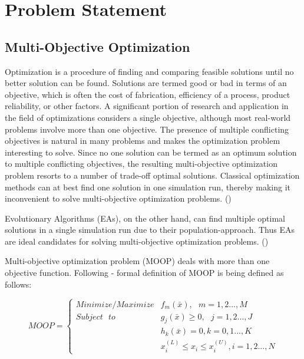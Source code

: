\chapter{Problem Statement}
\label{cha:multiObjectiveOptimization}




\section{Multi-Objective Optimization}
\label{sec:multi}

Optimization is a procedure of finding and comparing feasible solutions until no better solution can be found.
Solutions are termed good or bad in terms of an objective, which is often the cost of fabrication, efficiency of a process, product reliability,
or other factors.
A significant portion of research and application in the field of optimizations considers a single objective, although most real-world problems involve more than one objective.
The presence of multiple conflicting objectives is natural in many problems and makes the optimization problem interesting to solve.
Since no one solution can be termed as an optimum solution to multiple conflicting objectives, the resulting multi-objective optimization problem resorts to a number
of trade-off optimal solutions.
Classical optimization methods can at best find one solution in one simulation run, thereby making it inconvenient to solve multi-objective optimization problems.
(\cite{Deb:2001:MOU:559152})

Evolutionary Algorithms (EAs), on the other hand, can find multiple optimal solutions in a single simulation run due to their population-approach. 
Thus EAs are ideal candidates for solving multi-objective optimization problems.  
(\cite{Deb:2001:MOU:559152})


Multi-objective optimization problem (MOOP) deals with more than one objective function.
Following \cite{Deb:2001:MOU:559152} - formal definition of MOOP is being defined as follows:

\begin{equation} 
MOOP =
 \begin{cases}
     Minimize/Maximize  & f_{m}(\bar{x}), \text{ } m = 1,2...,M \\
     Subject \text{ } to  &  g_{j}(\bar{x}) \geq 0, \text{ } j = 1,2..., J  \\ 
			  &  h_{k}(\bar{x}) = 0, k = 0,1...,K \\
			  &  x_{i}^{(L)} \leq x_{i} \leq x_{i}^{(U)}, i = 1,2...,N
      
\end{cases}  
\end{equation}


